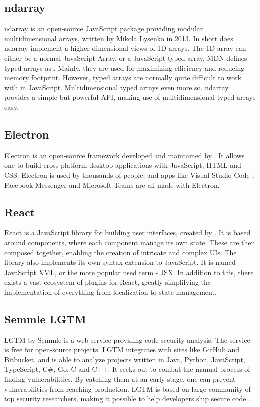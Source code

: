 \subsection{ndarray}
ndarray is an open-source JavaScript package providing modular multidimensional arrays, written by Mikola Lysenko in 2013. In short does ndarray implement a higher dimensional views of 1D arrays. The 1D array can either be a normal JavaScript  Array, or a JavaScript typed array. MDN defines typed arrays as . Mainly, they are used for maximizing efficiency and reducing memory footprint. However, typed arrays are normally quite difficult to work with in JavaScript. Multidimensional typed arrays even more so. ndarray provides a simple but powerful API, making use of multidimensional typed arrays easy.

\subsection{Electron}
Electron \cite{electron} is an open-source framework developed and maintained by \citet{github}. It allows one to build cross-platform desktop applications with JavaScript, HTML and CSS. Electron is used by thousands of people, and apps like Visual Studio Code \cite{visual-studio-code}, Facebook Messenger \cite{messenger} and Microsoft Teams \cite{teams} are all made with Electron.

\subsection{React}
React \cite{react} is a JavaScript library for building user interfaces, created by \citet{facebook}. It is based around components, where each component manage its own state. These are then composed together, enabling the creation of intricate and complex UIs. The library also implements its own syntax extension to JavaScript. It is named JavaScript XML, or the more popular used term - JSX. In addition to this, there exists a vast ecosystem of plugins for React, greatly simplifying the implementation of everything from localization to state management.

\subsection{Semmle LGTM}
LGTM by Semmle \cite{lgtm} is a web service providing code security analysis. The service is free for open-source projects. LGTM integrates with sites like GitHub and Bitbucket, and is able to analyze projects written in Java, Python, JavaScript, TypeScript, C\#, Go, C and C++. It seeks out to combat the manual process of finding vulnerabilities. By catching them at an early stage, one can prevent vulnerabilities from reaching production. LGTM is based on large community of top security researchers, making it possible to help developers ship secure code \cite{lgtm-security}.

